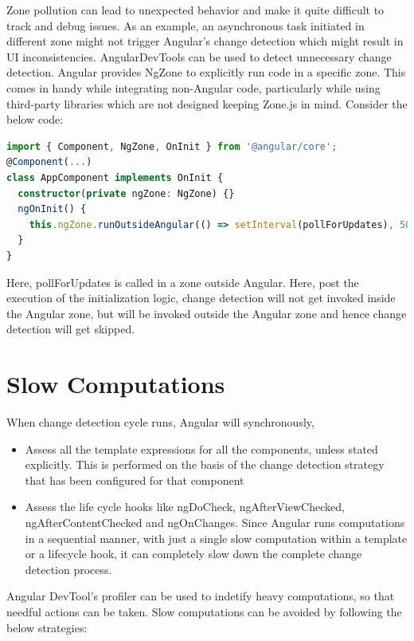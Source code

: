 \documentclass{report}
\begin{document}
Zone pollution can lead to unexpected behavior and make it quite difficult to track and debug issues. As an example, an asynchronous task initiated in different zone might not trigger Angular’s change detection which might result in UI inconsistencies. AngularDevTools can be used to detect unnecessary change detection.
Angular provides NgZone to explicitly run code in a specific zone. This comes in handy while integrating non-Angular code, particularly while using third-party libraries which are not designed keeping Zone.js in mind. Consider the below code:
\begin{lstlisting}[language=Typescript, caption=app.component.ts]
import { Component, NgZone, OnInit } from '@angular/core';
@Component(...)
class AppComponent implements OnInit {
  constructor(private ngZone: NgZone) {}
  ngOnInit() {
    this.ngZone.runOutsideAngular(() => setInterval(pollForUpdates), 500);
  }
}
\end{lstlisting}
Here, pollForUpdates is called in a zone outside Angular. Here, post the execution of the initialization logic, change detection will not get invoked inside the Angular zone, but will be invoked outside the Angular zone and hence change detection will get skipped.
\chapter{Slow Computations}
When change detection cycle runs, Angular will synchronously, 
\begin{itemize}
	\item{Assess all the template expressions for all the components, unless stated explicitly. This is performed on the basis of the change detection strategy that has been configured for that component}
\item{Assess the life cycle hooks like ngDoCheck, ngAfterViewChecked, ngAfterContentChecked and ngOnChanges. Since Angular runs computations in a sequential manner, with just a single slow computation within a template or a lifecycle hook, it can completely slow down the complete change detection process.}
\end{itemize}
Angular DevTool’s profiler can be used to indetify heavy computations, so that needful actions can be taken.
Slow computations can be avoided by following the below strategies:
\end{document}
